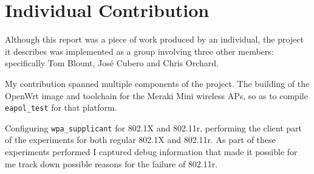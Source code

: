 \documentclass[pdftex, 12pt, a4paper]{article}
\begin{document}
\section{Individual Contribution}
Although this report was a piece of work produced by an individual, the project it describes was implemented as a group involving three other members: specifically Tom Blount, José Cubero and Chris Orchard.

My contribution spanned multiple components of the project.  The building of the OpenWrt image and toolchain for the Meraki Mini wireless APs, so as to compile \verb`eapol_test` for that platform.

Configuring \verb`wpa_supplicant` for 802.1X and 802.11r, performing the client part of the experiments for both regular 802.1X and 802.11r.  As part of these experiments performed I captured debug information that made it possible for me track down possible reasons for the failure of 802.11r.


{}

\appendix

\end{document}
